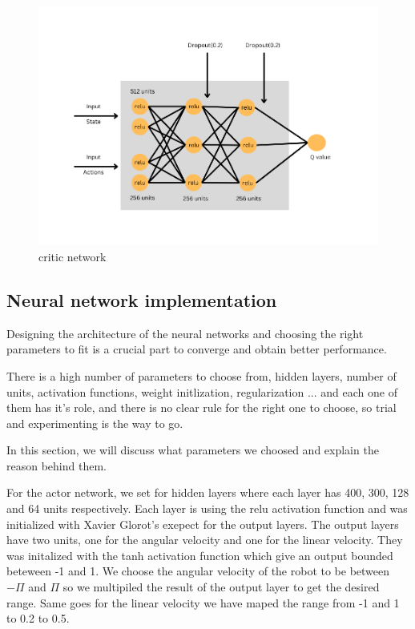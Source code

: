 \documentclass[12pt]{extarticle}
\begin{document}
 \begin{figure}[h]  
\centering
\includegraphics[scale=0.65]{critic_net}
\caption[critic network]{critic network}
\end{figure}









 

\subsection{Neural network implementation}
Designing the architecture of the neural networks and choosing the right parameters to fit is a crucial part to converge and obtain better performance.

There is a high  number of  parameters to choose from,  hidden layers, number of units, activation functions, weight initlization, regularization ... and each one of them has it's role, and there is no clear rule for the right one to choose, so trial and experimenting is the way to go.

In this section, we will discuss what parameters we choosed and explain the reason behind them.


For the actor network, we set for hidden layers where each layer has 400, 300, 128 and 64 units respectively. Each layer is using the relu activation function and was initialized with Xavier Glorot's exepect for the output layers. The output layers have two units, one for the angular velocity and one for the linear velocity. They was initalized with the tanh activation function which give an output bounded beteween -1 and 1. We choose the angular velocity of  the robot to be between $-\Pi$ and $\Pi$ so we multipiled the result of the output layer to get the desired range. Same goes for the linear velocity we have maped the range from -1 and 1 to 0.2 to 0.5. 
\end{document}

